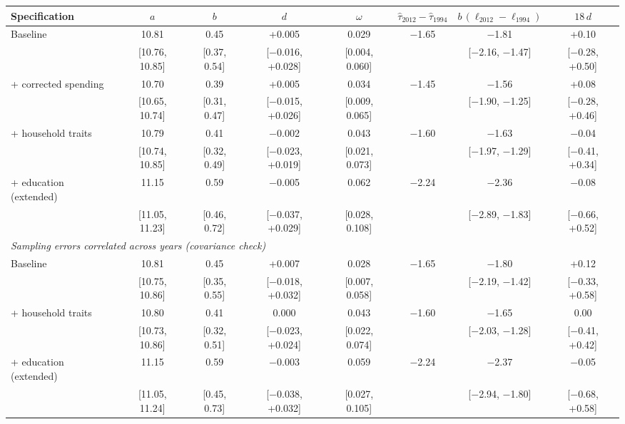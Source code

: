 \footnotesize
\begin{tabular}{lccccccc}
\toprule
Specification & $a$ & $b$ & $d$ & $\omega$ & $\hat\tau_{2012}-\hat\tau_{1994}$ & $b\,(\ell_{2012}-\ell_{1994})$ & $18\,d$ \\
\midrule
Baseline & 10.81 & 0.45 & +0.005 & 0.029 & $-$1.65 & $-$1.81 & +0.10 \\
 & [10.76, 10.85] & [0.37, 0.54] & [$-$0.016, +0.028] & [0.004, 0.060] &  & [$-$2.16, $-$1.47] & [$-$0.28, +0.50] \\
+ corrected spending & 10.70 & 0.39 & +0.005 & 0.034 & $-$1.45 & $-$1.56 & +0.08 \\
 & [10.65, 10.74] & [0.31, 0.47] & [$-$0.015, +0.026] & [0.009, 0.065] &  & [$-$1.90, $-$1.25] & [$-$0.28, +0.46] \\
+ household traits & 10.79 & 0.41 & $-$0.002 & 0.043 & $-$1.60 & $-$1.63 & $-$0.04 \\
 & [10.74, 10.85] & [0.32, 0.49] & [$-$0.023, +0.019] & [0.021, 0.073] &  & [$-$1.97, $-$1.29] & [$-$0.41, +0.34] \\
+ education (extended) & 11.15 & 0.59 & $-$0.005 & 0.062 & $-$2.24 & $-$2.36 & $-$0.08 \\
 & [11.05, 11.23] & [0.46, 0.72] & [$-$0.037, +0.029] & [0.028, 0.108] &  & [$-$2.89, $-$1.83] & [$-$0.66, +0.52] \\
\midrule
\multicolumn{8}{l}{\textit{Sampling errors correlated across years (covariance check)}} \\
Baseline & 10.81 & 0.45 & +0.007 & 0.028 & $-$1.65 & $-$1.80 & +0.12 \\
 & [10.75, 10.86] & [0.35, 0.55] & [$-$0.018, +0.032] & [0.007, 0.058] &  & [$-$2.19, $-$1.42] & [$-$0.33, +0.58] \\
+ household traits & 10.80 & 0.41 & 0.000 & 0.043 & $-$1.60 & $-$1.65 & 0.00 \\
 & [10.73, 10.86] & [0.32, 0.51] & [$-$0.023, +0.024] & [0.022, 0.074] &  & [$-$2.03, $-$1.28] & [$-$0.41, +0.42] \\
+ education (extended) & 11.15 & 0.59 & $-$0.003 & 0.059 & $-$2.24 & $-$2.37 & $-$0.05 \\
 & [11.05, 11.24] & [0.45, 0.73] & [$-$0.038, +0.032] & [0.027, 0.105] &  & [$-$2.94, $-$1.80] & [$-$0.68, +0.58] \\
\bottomrule
\end{tabular}

